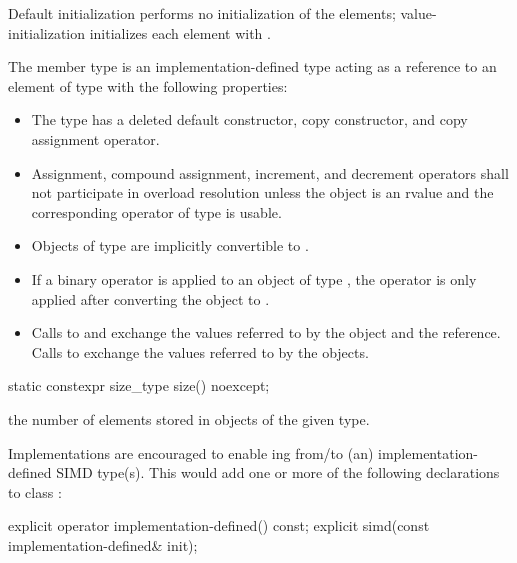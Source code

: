 \pnum Default initialization performs no initialization of the elements; value-initialization initializes each element with .

\pnum The member type  is an implementation-defined type acting as a reference to an element of type  with the following properties:
\label{sec:reference type}
\begin{itemize}
  \item The type has a deleted default constructor, copy constructor, and copy assignment operator.

  \item Assignment, compound assignment, increment, and decrement operators shall not participate in overload resolution unless the  object is an rvalue and the corresponding operator of type  is usable.

  \item Objects of type  are implicitly convertible to .

  \item If a binary operator is applied to an object of type , the operator is only applied after converting the  object to .

  \item Calls to  and  exchange the values referred to by the  object and the  reference.
  Calls to  exchange the values referred to by the  objects.
\end{itemize}

\begin{itemdecl}
static constexpr size_type size() noexcept;
\end{itemdecl}
\begin{itemdescr}
  \pnum\returns the number of elements stored in objects of the given \simd[<T, Abi>] type.
\end{itemdescr}

\pnum\begin{noteEnv} Implementations are encouraged to enable ing from/to (an) implementation-defined SIMD type(s).
This would add one or more of the following declarations to class \simd:
\begin{itemdecl}
explicit operator implementation-defined() const;
explicit simd(const implementation-defined& init);
\end{itemdecl}
\end{noteEnv}

